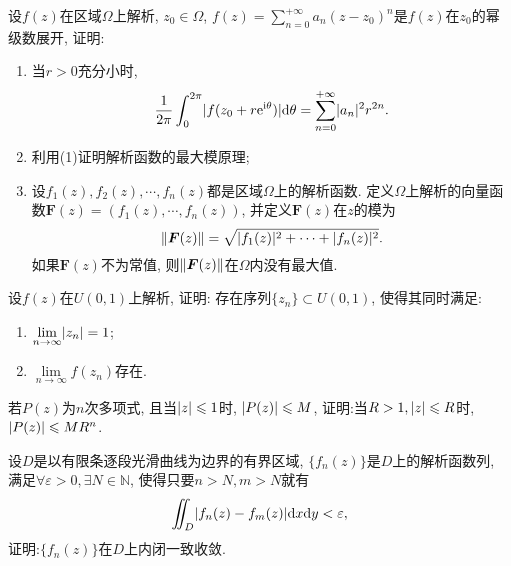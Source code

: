 \begin{yyEx}
    设$f(z)$在区域$\Omega$上解析, $z_0\in\Omega$, $f(z) = \sum_{n=0}^{+\infty}a_n(z-z_0)^n$是$f(z)$在$z_0$的幂级数展开, 证明:
    \begin{enumerate}
        \item 当$r>0$充分小时,\begin{equation*}
            \frac{1}{2\mathrm{\pi}}\int_{0}^{2\mathrm{\pi}}\lvert f(z_0+r\mathrm{e}^{\mathrm{i}\theta})\rvert\mathrm{d}\theta = \sum_{n = 0}^{+\infty}\lvert a_n\rvert^2r^{2n}.
        \end{equation*}
        \item 利用(1)证明解析函数的最大模原理;
        \item 设$f_1(z),f_2(z),\cdots,f_n(z)$都是区域$\Omega$上的解析函数. 定义$\Omega$上解析的向量函数$\bm{F}(z) = (f_1(z),\cdots,f_n(z))$, 并定义$\bm{F}(z)$在$z$的模为
        \begin{equation*}
            \|\bm{F}(z)\| = \sqrt{\lvert f_1(z)\rvert^2+\cdots+\lvert f_n(z)\rvert^2}.
        \end{equation*}
        如果$\bm{F}(z)$不为常值, 则$\|\bm{F}(z)\|$在$\Omega$内没有最大值.
    \end{enumerate}
\end{yyEx}

\begin{yyEx}
    设$f(z)$在$U(0,1)$上解析, 证明: 存在序列$\{z_n\}\subset U(0,1)$, 使得其同时满足:
    \begin{enumerate}
        \item $\lim\limits_{n\to\infty}\lvert z_n\rvert = 1$;
        \item $\lim\limits_{n\to\infty}f(z_n)$存在.
    \end{enumerate}
\end{yyEx}

\begin{yyEx}
    若$P(z)$为$n$次多项式, 且当$\lvert z\rvert\leqslant 1$时, $\lvert P(z)\rvert\leqslant M$, 证明:当$R>1, \lvert z\rvert\leqslant R$时, $\lvert P(z)\rvert\leqslant MR^n$. 
\end{yyEx}

\begin{yyEx}
    设$D$是以有限条逐段光滑曲线为边界的有界区域, $\{ f_n(z)\}$是$D$上的解析函数列, 满足$\forall\varepsilon>0,\exists N\in\mathbb{N}$, 使得只要$n>N,m>N$就有\begin{equation*}
        \iint_{D}\lvert f_n(z)-f_m(z)\rvert\mathrm{d}x\mathrm{d}y<\varepsilon,
    \end{equation*}
    证明:$\{f_n(z)\}$在$D$上内闭一致收敛.
\end{yyEx}

